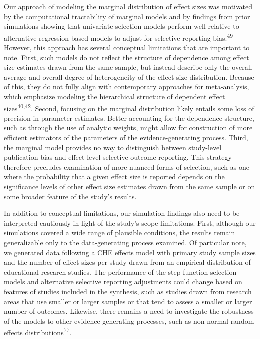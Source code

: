 \documentclass[
  american,
  man, donotrepeattitle,floatsintext]{apa7}
\begin{document}
Our approach of modeling the marginal distribution of effect sizes was motivated by the computational tractability of marginal models and by findings from prior simulations showing that univariate selection models perform well relative to alternative regression-based models to adjust for selective reporting bias.\textsuperscript{49}
However, this approach has several conceptual limitations that are important to note.
First, such models do not reflect the structure of dependence among effect size estimates drawn from the same sample, but instead describe only the overall average and overall degree of heterogeneity of the effect size distribution.
Because of this, they do not fully align with contemporary approaches for meta-analysis, which emphasize modeling the hierarchical structure of dependent effect sizes\textsuperscript{40,42}.
Second, focusing on the marginal distribution likely entails some loss of precision in parameter estimates.
Better accounting for the dependence structure, such as through the use of analytic weights, might allow for construction of more efficient estimators of the parameters of the evidence-generating process.
Third, the marginal model provides no way to distinguish between study-level publication bias and effect-level selective outcome reporting.
This strategy therefore precludes examination of more nuanced forms of selection, such as one where the probability that a given effect size is reported depends on the significance levels of other effect size estimates drawn from the same sample or on some broader feature of the study's results.

In addition to conceptual limitations, our simulation findings also need to be interpreted cautiously in light of the study's scope limitations.
First, although our simulations covered a wide range of plausible conditions, the results remain generalizable only to the data-generating process examined.
Of particular note, we generated data following a CHE effects model with primary study sample sizes and the number of effect sizes per study drawn from an empirical distribution of educational research studies.
The performance of the step-function selection models and alternative selective reporting adjustments could change based on features of studies included in the synthesis, such as studies drawn from research areas that use smaller or larger samples or that tend to assess a smaller or larger number of outcomes.
Likewise, there remains a need to investigate the robustness of the models to other evidence-generating processes, such as non-normal random effects distributions\textsuperscript{77}.
\end{document}
